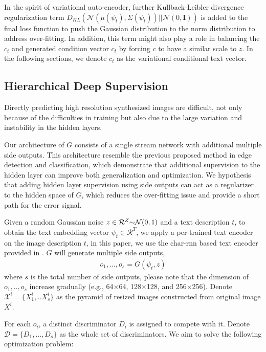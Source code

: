 \documentclass[10pt,twocolumn,letterpaper]{article}
\begin{document}
 In the spirit of variational auto-encoder, further Kullback-Leibler divergence regularization term  $D_{KL}(\mathcal{N}(\mu(\psi_t), \Sigma(\psi_t) )|| \mathcal{N}(0, \bm{I}))$ is added to the final loss function to push the Gaussian distribution to the norm distribution to address over-fitting.  In addition, this term might also play a role in balancing the $c_t$ and generated condition vector $c_t$ by forcing $c$ to have a similar scale to $z$.  In the following sections, we denote $c_t$ as the variational conditional text vector.

\subsection{Hierarchical Deep Supervision}
Directly predicting high resolution synthesized images are difficult, not only because of the difficulties in training but also due to the large variation and instability in the hidden layers.

Our architecture of $G$ consists of a single stream network with additional multiple side outputs. This architecture resemble the previous proposed method in edge detection\cite{hed} and classification\cite{deepsup}, which demonstrate that additional supervision to the hidden layer can improve both generalization and optimization.  We hypothesis that adding hidden layer supervision using side outputs can act as a regularizer to the hidden space of $G$, which reduces the over-fitting issue and provide a short path for the error signal.

Given a random Gaussian noise  $z\in \mathcal{R}^{Z} \scriptsize{\sim} \mathcal{N}(0,1)$ and a text description $t$, to obtain the text embedding vector $\psi_{t}\in \mathcal{R}^{T}$, we apply a per-trained text encoder on the image description $t$, in this paper, we use the char-rnn based text encoder provided in \cite{reed2016generative}.  $G$ will generate multiple side outputs,
\begin{equation}
\label{side}
\begin{split}
	o_1,...,o_s = G(\psi_{t}, z)	   
\end{split}
\end{equation}
where $s$ is the total number of side outputs, please note that the dimension of $o_1,..,o_s$ increase gradually (e.g., 64$\times$64, 128$\times$128, and 256$\times$256). Denote $\mathcal{X}^i = \{X^i_1, .. X^i_s\}$ as the pyramid of  resized images constructed from original image $X^i$.

For each $o_i$, a distinct discriminator $D_i$ is assigned to compete with it. Denote $\mathcal{D}=\{D_1, ..., D_o\}$ as the whole set of discriminators.
We aim to solve the following optimization problem:
\end{document}
